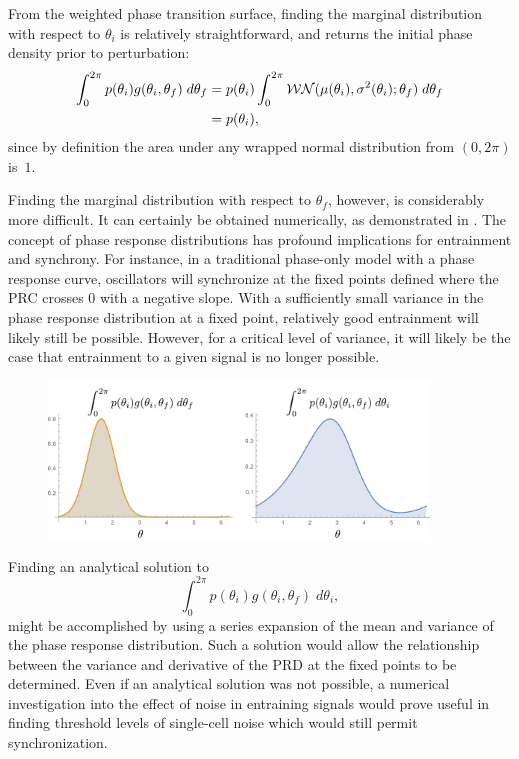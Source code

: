 From the weighted phase transition surface, finding the marginal distribution with respect to $\theta_i$ is relatively straightforward, and returns the initial phase density prior to perturbation:
\begin{align*}
  \int_0^{2\pi} p(\theta_i) g(\theta_i, \theta_f) \; d\theta_f &= p(\theta_i) \int_0^{2\pi} {\cal WN}(\mu(\theta_i), \sigma^2(\theta_i); \theta_f) \; d\theta_f \\
  &= p(\theta_i),
\end{align*}
since by definition the area under any wrapped normal distribution from $(0, 2\pi)$ is~$1$.

Finding the marginal distribution with respect to $\theta_f$, however, is considerably more difficult.
It can certainly be obtained numerically, as demonstrated in .
The concept of phase response distributions has profound implications for entrainment and synchrony.
For instance, in a traditional phase-only model with a phase response curve, oscillators will synchronize at the fixed points defined where the PRC crosses 0 with a negative slope.
With a sufficiently small variance in the phase response distribution at a fixed point, relatively good entrainment will likely still be possible.
However, for a critical level of variance, it will likely be the case that entrainment to a given signal is no longer possible.

\begin{figure}[tbp]
  \centering
  \includegraphics[width=0.9\textwidth]{chap7/figures/phat.pdf}
  \label{fig:phat7}
\end{figure}

Finding an analytical solution to
\[
  \int_0^{2\pi} p(\theta_i) g(\theta_i, \theta_f) \; d\theta_i,
\]
might be accomplished by using a series expansion of the mean and variance of the phase response distribution.
Such a solution would allow the relationship between the variance and derivative of the PRD at the fixed points to be determined.
Even if an analytical solution was not possible, a numerical investigation into the effect of noise in entraining signals would prove useful in finding threshold levels of single-cell noise which would still permit synchronization.

